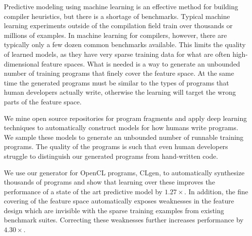 Predictive modeling using machine learning is an effective method for building compiler heuristics, but there is a shortage of benchmarks. Typical machine learning experiments outside of the compilation field train over thousands or millions of examples. In machine learning for compilers, however, there are typically only a few dozen common benchmarks available. This limits the quality of learned models, as they have very sparse training data for what are often high-dimensional feature spaces. What is needed is a way to generate an unbounded number of training programs that finely cover the feature space. At the same time the generated programs must be similar to the types of programs that human developers actually write, otherwise the learning will  target the wrong parts of the feature space. 

We mine open source repositories for program fragments and apply deep learning techniques to automatically construct models for how humans write programs. We sample these models to generate an unbounded number of runnable training programs. The quality of the programs is such that even human developers struggle to distinguish our generated programs from hand-written code.

We use our generator for OpenCL programs, CLgen, to automatically synthesize thousands of programs and show that learning over these improves the performance of a state of the art predictive model by $1.27\times$. In addition, the fine covering of the feature space automatically exposes weaknesses in the feature design which are invisible with the sparse training examples from existing benchmark suites. Correcting these weaknesses further increases performance by $4.30\times$.
